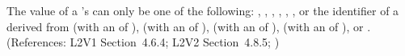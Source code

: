 The value of a \Species's   can only be one of
the following: , , , ,
, , or the identifier of a
\UnitDefinition derived from  (with an  of
),  (with an  of ), 
(with an  of ),  (with an
 of ), or .  (References: L2V1
Section~4.6.4; L2V2 Section~4.8.5; )
